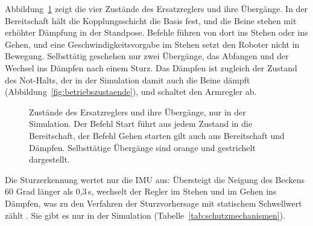 Abbildung~\ref{fig:ersatzregler_zustaende} zeigt die vier Zustände des Ersatzreglers und ihre Übergänge.
In der Bereitschaft hält die Kopplungsschicht die Basis fest, und die Beine stehen mit erhöhter Dämpfung in der Standpose.
Befehle führen von dort ins Stehen oder ins Gehen, und eine Geschwindigkeitsvorgabe im Stehen setzt den Roboter nicht in Bewegung.
Selbsttätig geschehen nur zwei Übergänge, das Abfangen und der Wechsel ins Dämpfen nach einem Sturz.
Das Dämpfen ist zugleich der Zustand des Not-Halts, der in der Simulation damit auch die Beine dämpft (Abbildung~\ref{fig:betriebszustaende}), und schaltet den Armregler ab.

\begin{figure}[htbp]
  \centering
  
  \caption[Zustände des Ersatzreglers]{Zustände des Ersatzreglers und ihre Übergänge, nur in der Simulation. Der Befehl Start führt aus jedem Zustand in die Bereitschaft, der Befehl Gehen starten gilt auch aus Bereitschaft und Dämpfen. Selbsttätige Übergänge sind orange und gestrichelt dargestellt.}
  \label{fig:ersatzregler_zustaende}
\end{figure}

Die Sturzerkennung wertet nur die IMU aus: Übersteigt die Neigung des Beckens 60 Grad länger als 0,3\,s, wechselt der Regler im Stehen und im Gehen ins Dämpfen, was zu den Verfahren der Sturzvorhersage mit statischem Schwellwert zählt \cite{Subburaman2023}.
Sie gibt es nur in der Simulation (Tabelle~\ref{tab:schutzmechanismen}).

